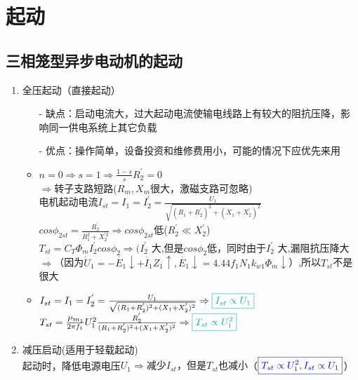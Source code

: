 \documentclass[blue]{elegantnote}
\begin{document}
\section{起动}
\subsection{三相笼型异步电动机的起动}
\begin{enumerate}
	\item 全压起动（直接起动）
	\begin{itemize}
		\item[-] 缺点：{\color{thid}启动电流大}，过大起动电流使输电线路上有较大的阻抗压降，影响同一供电系统上其它负载
		\item[-] 优点：操作简单，设备投资和维修费用小，可能的情况下应优先来用
	\end{itemize}
	\begin{note}
		\begin{itemize}
			\item $n=0 \Rightarrow s=1 \Rightarrow \frac{1-s}{s}R_2^{'}=0$\\
			$\Rightarrow$转子支路短路($R_m,X_m$很大，激磁支路可忽略)\\
			电机起动电流$I_{st}=I_1=I_2^{'}=\frac{U_1}{\sqrt{(R_1+R_2^{'})^{2}+(X_1+X_2^{'})^{2}}}$\\
			$cos\phi_{2st}=\frac{R_2^{'}}{R_1^{2}+X_2^{'2}}\Rightarrow cos\phi_{2st}$低($R_2^{'}\ll X_2^{'}$)\\
			$T_{st}=C_T\Phi_m{I_2^{'}cos\phi_2}\Rightarrow(I_{2}^{'}$ 大,但是$cos\phi_2$低，同时由于$I_{2}^{'}$ 大,漏阻抗压降大$\Rightarrow$（因为$\dot U_1=-\dot{E_1}\downarrow+\boxed{\dot{I_1}Z_1}\uparrow,\dot{E_1}\downarrow=4.44f_1N_1k_{w1}\boxed{\Phi_m}\downarrow$）,所以$T_{st}$不是很大
			\item $I_{st}=I_1=I_2^{'}=\frac{U_1}{\sqrt{(R_1+R_2^{'})^{2}+(X_1+X_2^{'})^{2}}}\Rightarrow {\color{thid}\boxed{I_{st}\propto U_{1}}}$\\
			$T_{st}=\frac{Pm_1}{2\pi f_{1}}U_1^{2}\frac{R_2^{'}}{(R_1+R_2^{'})^{2}+(X_1+X_2^{'})^{2}}\Rightarrow {\color{thid}\boxed{T_{st}\propto U_{1}^{2}}}$
		\end{itemize}
	\end{note}
	\item 减压启动(适用于轻载起动)\\
	起动时，降低电源电压$U_1\Rightarrow${\color{thid}减少$I_{st}$，但是$T_{st}$也减小}（${\color{blue}\boxed{T_{st}\propto U_{1}^{2},I_{st}\propto U_{1}}}$）
\end{enumerate}
\end{document}
